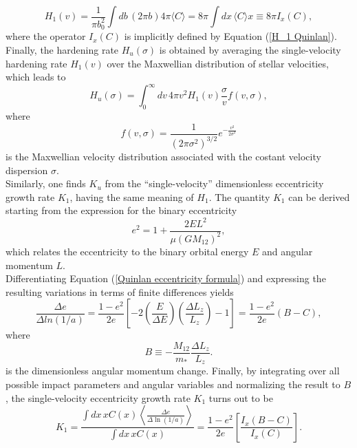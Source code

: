 \documentclass[12pt,twoside,openany]{book}
\begin{document}
\begin{equation}\label{H_1 Quinlan}
H_1(v)=\frac{1}{\pi b_0^2}\int db\,(2\pi b) 4 \pi \langle C\rangle=8 \pi \int dx\, \langle C\rangle x \equiv8\pi I_x(C),
\end{equation}
where the operator $I_x(C)$ is implicitly defined by Equation (\ref{H_1 Quinlan}). Finally, the hardening rate $H_u(\sigma)$ is obtained by averaging the single-velocity hardening rate $H_1(v)$ over the Maxwellian distribution of stellar velocities, which leads to
\begin{equation}
H_u(\sigma)=\int_0^\infty dv\, 4\pi v^2 H_1(v)\frac{\sigma}{v} f(v,\sigma),
\end{equation}
where
\begin{equation}
f(v,\sigma)=\frac{1}{(2\pi\sigma^2)^{3/2}}
e^{-\frac{v^2}{2\sigma^2}}
\end{equation}
is the Maxwellian velocity distribution associated with the costant velocity dispersion $\sigma$.\\Similarly, one finds $K_u$ from the “single-velocity” dimensionless eccentricity growth rate $K_1$, having the same meaning of $H_1$. The quantity $K_1$ can be derived starting from the expression for the binary eccentricity
\begin{equation}\label{Quinlan eccentricity formula}
e^2=1+\frac{2EL^2}{\mu(GM_{12})^2},
\end{equation}
which relates the eccentricity to the binary orbital energy $E$ and angular momentum $L$.\\Differentiating Equation (\ref{Quinlan eccentricity formula}) and expressing the resulting variations in terms of finite differences yields
\begin{equation}
    \frac{\Delta e}{\Delta ln(1/a)}=\frac{1-e^2}{2e}\left[-2\left(\frac{E}{\Delta E}\right)\left(\frac{\Delta L_z}{L_z}\right)-1\right]=\frac{1-e^2}{2e}(B-C),
\end{equation}
where
\begin{equation}\label{B quinlan}
    B\equiv-\frac{M_{12}}{m_*}\frac{\Delta L_z}{L_z}.
\end{equation}
is the dimensionless angular momentum change. Finally, by integrating over all possible impact parameters and angular variables and normalizing the result to $B$, the single-velocity eccentricity growth rate $K_1$ turns out to be
\begin{equation}
K_1=\frac{\int dx\,xC(x)\left\langle \frac{\Delta e}{\Delta\ln(1/a)}\right\rangle}{\int dx\,xC(x)}
=\frac{1-e^2}{2e}\left[\frac{I_x(B-C)}{I_x(C)}\right].
\end{equation}
\end{document}
